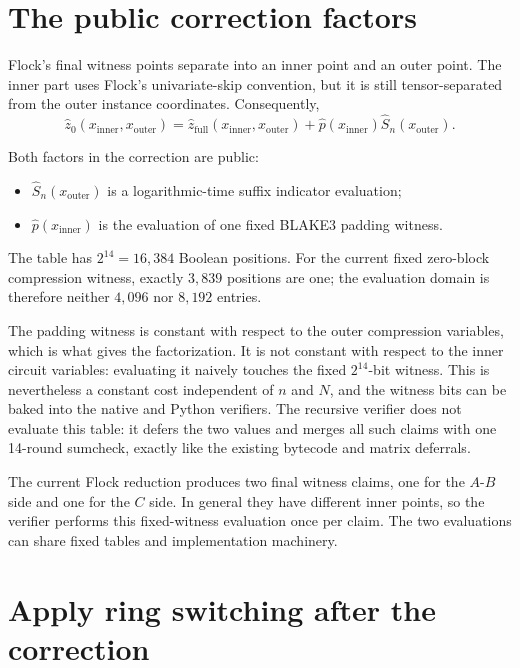 \documentclass[11pt]{article}
\begin{document}
\section{The public correction factors}

Flock's final witness points separate into an inner point and an outer point.
The inner part uses Flock's univariate-skip convention, but it is still
tensor-separated from the outer instance coordinates.  Consequently,
\[
    \widehat z_0(x_{\mathrm{inner}},x_{\mathrm{outer}})
      =
    \widehat z_{\mathrm{full}}(x_{\mathrm{inner}},x_{\mathrm{outer}})
      +
    \widehat p(x_{\mathrm{inner}})
    \widehat S_n(x_{\mathrm{outer}}).
\]

Both factors in the correction are public:

\begin{itemize}
  \item \(\widehat S_n(x_{\mathrm{outer}})\) is a logarithmic-time suffix
        indicator evaluation;
  \item \(\widehat p(x_{\mathrm{inner}})\) is the evaluation of one fixed
        BLAKE3 padding witness.
\end{itemize}

The table has \(2^{14}=16{,}384\) Boolean positions.  For the current fixed
zero-block compression witness, exactly \(3{,}839\) positions are one; the
evaluation domain is therefore neither \(4{,}096\) nor \(8{,}192\) entries.

The padding witness is constant with respect to the outer compression
variables, which is what gives the factorization.  It is not constant with
respect to the inner circuit variables: evaluating it naively touches the
fixed \(2^{14}\)-bit witness.  This is nevertheless a constant cost independent
of \(n\) and \(N\), and the witness bits can be baked into the native and
Python verifiers.  The recursive verifier does not evaluate this table:
it defers the two values and merges all such claims with one 14-round
sumcheck, exactly like the existing bytecode and matrix deferrals.

The current Flock reduction produces two final witness claims, one for the
\(A\)-\(B\) side and one for the \(C\) side.  In general they have different
inner points, so the verifier performs this fixed-witness evaluation once per
claim.  The two evaluations can share fixed tables and implementation
machinery.

\section{Apply ring switching after the correction}
\end{document}

